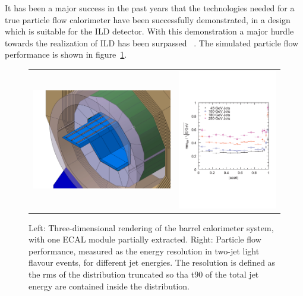 \documentclass[%
 amsmath,amssymb,
 aps,
]{revtex4-1}
\begin{document}
It has been a major success in the past years that the technologies needed for a true particle flow calorimeter have been successfully demonstrated, in a design which is suitable for the ILD detector. With this demonstration a major hurdle towards the realization of ILD has been surpassed ~\cite{Sefkow:2015hna}. The simulated particle flow performance is shown in figure~\ref{fig:pflow}.
\begin{figure}[th]
    \centering
    \begin{tabular}{lr}
    \includegraphics[width=0.45\hsize]{figures/ECal_insertion.jpg}&
    \includegraphics[width=0.4\hsize]{figures/pflow.pdf}\\
    \end{tabular}
    \caption{Left: Three-dimensional rendering of the barrel calorimeter system, with one ECAL module partially extracted. Right: Particle flow performance, measured as the energy resolution in two-jet light flavour events, for different jet energies. The resolution is defined as the rms of the distribution truncated so tha t$90$ of the total jet energy are contained inside the distribution.}
    \label{fig:pflow}
\end{figure}
\end{document}
